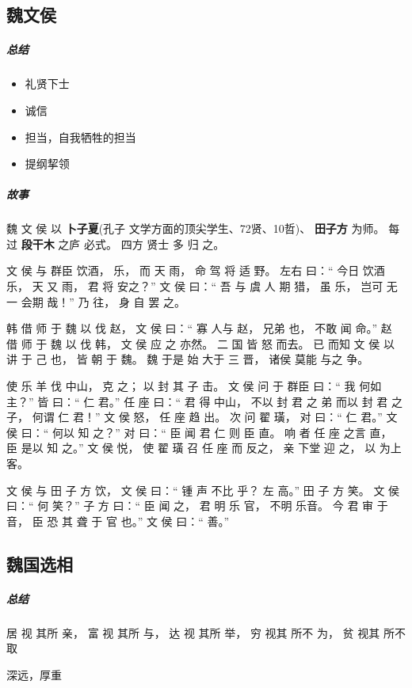 \documentclass[UTF8,a4paper,8pt]{ctexbook}
\begin{document}
		\subsection{魏文侯}
			\subparagraph{总结}
				\begin{itemize}[itemindent = 1em]
					\item 礼贤下士
					\item 诚信
					\item 担当，自我牺牲的担当
					\item 提纲挈领
				\end{itemize} 
			
			\subparagraph{故事}
				魏 文 侯 以 \textbf{卜子夏}(孔子 文学方面的顶尖学生、72贤、10哲)、 \textbf{田子方} 为师。 每过 \textbf{段干木} 之庐 必式。 四方 贤士 多 归 之。
				
				文 侯 与 群臣 饮酒， 乐， 而 天 雨， 命 驾 将 适 野。 左右 曰：“ 今日 饮酒 乐， 天 又 雨， 君 将 安之？” 文 侯 曰：“ 吾 与 虞 人 期 猎， 虽 乐， 岂可 无一 会期 哉！” 乃 往， 身 自 罢 之。
				
				韩 借 师 于 魏 以 伐 赵， 文 侯 曰：“ 寡 人与 赵， 兄弟 也， 不敢 闻 命。” 赵 借 师 于 魏 以 伐 韩， 文 侯 应 之 亦然。 二 国 皆 怒 而去。 已 而知 文 侯 以 讲 于 己 也， 皆 朝 于 魏。 魏 于是 始 大于 三 晋， 诸侯 莫能 与之 争。
				
				使 乐 羊 伐 中山， 克 之； 以 封 其 子 击。 文 侯 问 于 群臣 曰：“ 我 何如 主？” 皆 曰：“ 仁 君。” 任 座 曰：“ 君 得 中山， 不以 封 君 之 弟 而以 封 君 之子， 何谓 仁 君！” 文 侯 怒， 任 座 趋 出。 次 问 翟 璜， 对 曰：“ 仁 君。” 文 侯 曰：“ 何以 知 之？” 对 曰：“ 臣 闻 君 仁 则 臣 直。 响 者 任 座 之言 直， 臣 是以 知 之。” 文 侯 悦， 使 翟 璜 召 任 座 而 反之， 亲 下堂 迎 之， 以 为上 客。
				
				文 侯 与 田 子 方 饮， 文 侯 曰：“ 锺 声 不比 乎？ 左 高。” 田 子 方 笑。 文 侯 曰：“ 何 笑？” 子 方 曰：“ 臣 闻 之， 君 明 乐 官， 不明 乐音。 今 君 审 于 音， 臣 恐 其 聋 于 官 也。” 文 侯 曰：“ 善。”

		
		\subsection{魏国选相}
			\subparagraph{总结}居 视 其所 亲， 富 视 其所 与， 达 视 其所 举， 穷 视其 所不 为， 贫 视其 所不 取
				
				深远，厚重
			
\end{document}
